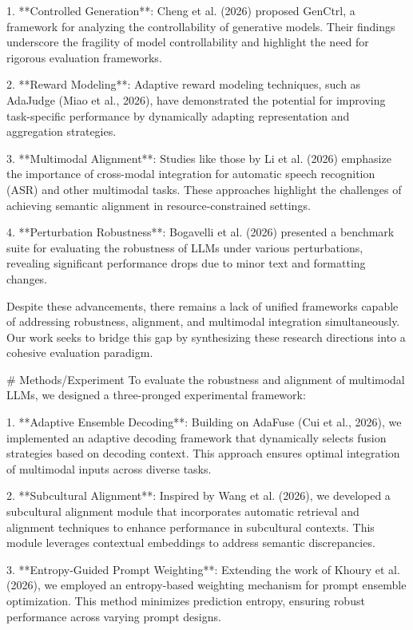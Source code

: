 1. **Controlled Generation**: Cheng et al. (2026) proposed GenCtrl, a framework for analyzing the controllability of generative models. Their findings underscore the fragility of model controllability and highlight the need for rigorous evaluation frameworks.

2. **Reward Modeling**: Adaptive reward modeling techniques, such as AdaJudge (Miao et al., 2026), have demonstrated the potential for improving task-specific performance by dynamically adapting representation and aggregation strategies.

3. **Multimodal Alignment**: Studies like those by Li et al. (2026) emphasize the importance of cross-modal integration for automatic speech recognition (ASR) and other multimodal tasks. These approaches highlight the challenges of achieving semantic alignment in resource-constrained settings.

4. **Perturbation Robustness**: Bogavelli et al. (2026) presented a benchmark suite for evaluating the robustness of LLMs under various perturbations, revealing significant performance drops due to minor text and formatting changes.

Despite these advancements, there remains a lack of unified frameworks capable of addressing robustness, alignment, and multimodal integration simultaneously. Our work seeks to bridge this gap by synthesizing these research directions into a cohesive evaluation paradigm.

# Methods/Experiment  
To evaluate the robustness and alignment of multimodal LLMs, we designed a three-pronged experimental framework:

1. **Adaptive Ensemble Decoding**: Building on AdaFuse (Cui et al., 2026), we implemented an adaptive decoding framework that dynamically selects fusion strategies based on decoding context. This approach ensures optimal integration of multimodal inputs across diverse tasks.

2. **Subcultural Alignment**: Inspired by Wang et al. (2026), we developed a subcultural alignment module that incorporates automatic retrieval and alignment techniques to enhance performance in subcultural contexts. This module leverages contextual embeddings to address semantic discrepancies.

3. **Entropy-Guided Prompt Weighting**: Extending the work of Khoury et al. (2026), we employed an entropy-based weighting mechanism for prompt ensemble optimization. This method minimizes prediction entropy, ensuring robust performance across varying prompt designs.

